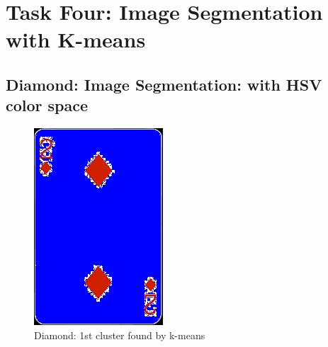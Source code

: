 \documentclass[conference]{IEEEtran}
\begin{document}
\section{Task Four: Image Segmentation with K-means} \label{four}

\subsection{Diamond: Image Segmentation: with HSV color space}

\begin{figure}[!htb]
  \centering
  \begin{minipage}[b]{0.2\textwidth}
    \includegraphics[width=\textwidth]{../programme/results/Task_4/diamond/HSV/image_1.jpg}
    \caption{Diamond: 1st cluster found by k-means}

\end{minipage}
\end{figure}
\end{document}
